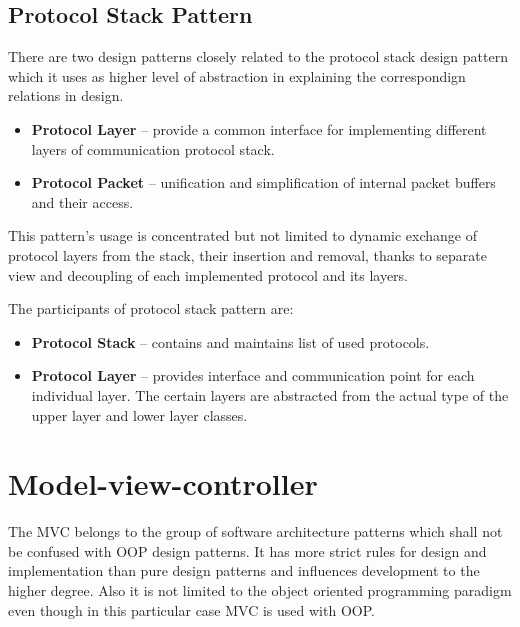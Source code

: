 
\subsection{Protocol Stack Pattern}
There are two design patterns closely related to the protocol stack design 
pattern which it uses as higher level of abstraction in explaining the 
correspondign relations in design.
\begin{itemize}
\item \textbf{Protocol Layer} -- provide a common interface for implementing
different layers of communication protocol stack.
\item \textbf{Protocol Packet} -- unification and simplification of internal
packet buffers and their access.
\end{itemize} 

This pattern's usage is concentrated but not limited to dynamic exchange of 
protocol layers from the stack, their insertion and removal, thanks to separate 
view and decoupling of each implemented protocol and its layers.

The participants of protocol stack pattern are:
\begin{itemize}
\item \textbf{Protocol Stack} -- contains and maintains list of used protocols.
\item \textbf{Protocol Layer} -- provides interface and communication point for 
each individual layer. The certain layers are abstracted from the actual type of
the upper layer and lower layer classes.
\end{itemize}



\section{Model-view-controller}
The MVC belongs to the group of software architecture patterns which shall not
be confused with OOP design patterns. It has more strict rules for design
and implementation than pure design patterns and influences development to the
higher degree. Also it is not limited to the object oriented programming 
paradigm even though in this particular case MVC is used with OOP.

